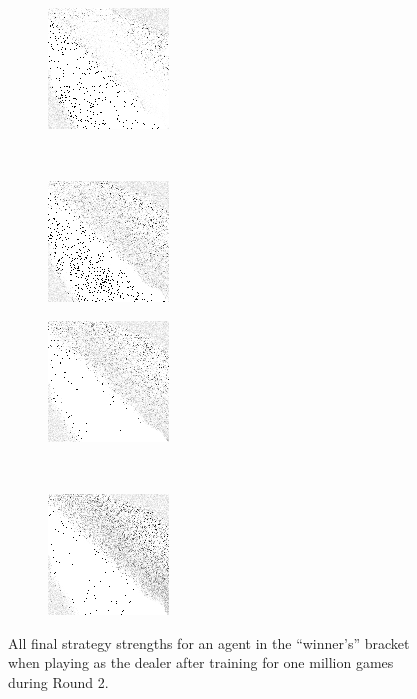 \begin{figure}
	\begin{subfigure}[b]{0.4\textwidth}
		\includegraphics[height=0.23\textheight]{images/findings/round2/strats/winner/crib_min_avg.png}
		\caption{\cribminavg}
	\end{subfigure}
	~
	\begin{subfigure}[b]{0.4\textwidth}
		\includegraphics[height=0.23\textheight]{images/findings/round2/strats/winner/pegging_max_avg_gained.png}
		\caption{\peggingmaxavggained}
	\end{subfigure}

	\begin{subfigure}[b]{0.4\textwidth}
		\includegraphics[height=0.23\textheight]{images/findings/round2/strats/winner/pegging_max_med_gained.png}
		\caption{\peggingmaxmedgained}
	\end{subfigure}
	~
	\begin{subfigure}[b]{0.4\textwidth}
		\includegraphics[height=0.23\textheight]{images/findings/round2/strats/winner/pegging_min_avg_given.png}
		\caption{\peggingminavggiven}
	\end{subfigure}

\caption{
	All final strategy strengths for an agent in the ``winner's'' bracket
	when playing as the dealer
	after training for one million games during Round 2.
}
\label{fig:r2-strats-winner}
\end{figure}
